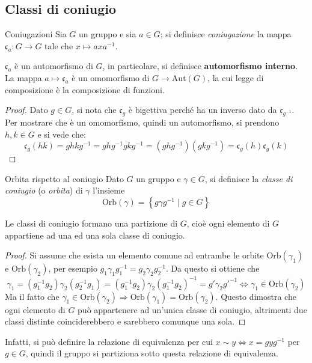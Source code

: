 \documentclass[11pt, a4paper]{scrartcl}
\theoremstyle{definition}
\numberwithin{esempio}{section}
\theoremstyle{definition}
\numberwithin{obs}{section}
\numberwithin{nota}{section}
\numberwithin{equation}{subsection}
\begin{document}
\subsection{Classi di coniugio}


\begin{definizione}
	{Coniugazioni}{}
	Sia $G$ un gruppo e sia $a \in G$; si definisce \textit{coniugazione} la mappa $\mathfrak{c} _a : G \to G$ tale che $x\mapsto axa^{-1} $.
\end{definizione}
\begin{prop}
	{}{}
$\mathfrak{c} _a$ \`e un automorfismo di $G$, in particolare, si definisce \textbf{automorfismo interno}.
La mappa $a \mapsto \mathfrak{c} _a$ \`e un omomorfismo di $G \to \mathrm{Aut} (G)$, la cui legge di composizione \`e la composizione di funzioni.
\begin{proof}
	Dato $g \in G$, si nota che $\mathfrak{c}_g$ \`e bigettiva perch\'e ha un inverso dato da $\mathfrak{c}_{g^{-1} } $.
	Per mostrare che \`e un omomorfismo, quindi un automorfismo, si prendono $h,k \in G$ e si vede che:
	\[
		\mathfrak{c}_g(hk) = ghkg^{-1} = ghg^{-1} gkg^{-1} = (ghg^{-1} )(gkg^{-1} ) = \mathfrak{c}_g(h)\mathfrak{c}_g(k)
	\] 
\end{proof}
\end{prop}
\begin{definizione}
	{Orbita rispetto al coniugio}{}
	Dato $G$ un gruppo e $\gamma\in G$, si definisce la \textit{classe di coniugio} (o \textit{orbita}) di $\gamma$ l'insieme
	\[
	\mathrm{Orb} (\gamma) = \left\{ g \gamma g^{-1}  \mid g \in G \right\} 
	\] 
\end{definizione}
\noindent Le classi di coniugio formano una partizione di $G$, cio\`e ogni elemento di $G$ appartiene ad una ed una sola classe di coniugio.
\begin{proof}
	Si assume che esista un elemento comune ad entrambe le orbite $\mathrm{Orb} (\gamma_1)$ e $\mathrm{Orb} (\gamma_2)$, per esempio $g_1 \gamma_1 g_1^{-1} = g_2\gamma_2 g^{-1} _2$.
	Da questo si ottiene che 
	\[
		\gamma_1 = (g_1^{-1} g_2) \gamma_2 (g_2^{-1} g_1)= (g_1^{-1} g_2) \gamma_2 (g_1^{-1}  g_2)^{-1} = g' \gamma_2 g'^{-1} \iff \gamma_1 \in \mathrm{Orb} (\gamma_2)
	\] 
	Ma il fatto che $\gamma_1 \in \mathrm{Orb}(\gamma_2) \Rightarrow \mathrm{Orb} (\gamma_1) = \mathrm{Orb} (\gamma_2)$.
	Questo dimostra che ogni elemento di $G$ pu\`o appartenere ad un'unica classe di coniugio, altrimenti due classi distinte coinciderebbero e sarebbero comunque una sola.
\end{proof}
	\noindent Infatti, si pu\`o definire la relazione di equivalenza per cui $x \sim y \iff x = gyg^{-1} $ per $g \in G$, quindi il gruppo si partiziona sotto questa relazione di equivalenza.
\end{document}
